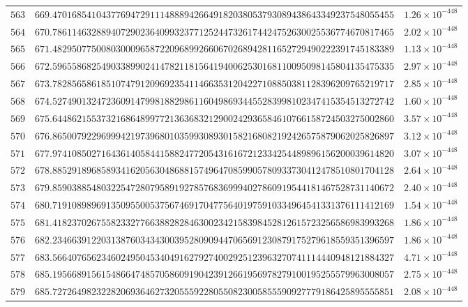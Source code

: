 \documentclass[12pt,reqno]{amsart}
\theoremstyle{remark}
\begin{document}
\begin{longtable}{clc}
$563$ & $669.4701685410437769472911148889426649182038053793089438643349237548055455$ & $1.26\times 10^{-448}$ \\
$564$ & $670.7861146328894072902364099323771252447326174424752630025536774670817465$ & $2.02\times 10^{-448}$ \\
$565$ & $671.4829507750080300096587220968992660670268942811652729490222391745183389$ & $1.13\times 10^{-448}$ \\
$566$ & $672.5965586825490338990241478211815641940062530168110095098145804135475335$ & $2.97\times 10^{-448}$ \\
$567$ & $673.7828565861851074791209692354114663531204227108850381128396209765219717$ & $2.85\times 10^{-448}$ \\
$568$ & $674.5274901324723609147998188298611604986934455283998102347415354513272742$ & $1.60\times 10^{-448}$ \\
$569$ & $675.6448621553732168648997721363683212900242936584610766158724503275002860$ & $3.57\times 10^{-448}$ \\
$570$ & $676.8650079229699942197396801035993089301582168082192426575879062025826897$ & $3.12\times 10^{-448}$ \\
$571$ & $677.9741085027164361405844158824772054316167212334254489896156200039614820$ & $3.07\times 10^{-448}$ \\
$572$ & $678.8852918968589341620563048688157496470859905780933730412478510801704128$ & $2.64\times 10^{-448}$ \\
$573$ & $679.8590388548032254728079589192785768369994027860919544181467528731140672$ & $2.40\times 10^{-448}$ \\
$574$ & $680.7191089896913509550053756746917047756401975910334964541331376111412169$ & $1.54\times 10^{-448}$ \\
$575$ & $681.4182370267558233277663882828463002342158398452812615723256586983993268$ & $1.86\times 10^{-448}$ \\
$576$ & $682.2346639122031387603434300395280909447065691230879175279618559351396597$ & $1.86\times 10^{-448}$ \\
$577$ & $683.5664076562346024950453404916279274002925123963270741114440948121884327$ & $4.71\times 10^{-448}$ \\
$578$ & $685.1956689156154866474857058609190423912661956978279100195255579963008057$ & $2.75\times 10^{-448}$ \\
$579$ & $685.7272649823228206936462732055592280550823005855590927779186425895555851$ & $2.08\times 10^{-448}$ \\

\end{longtable}
\end{document}
